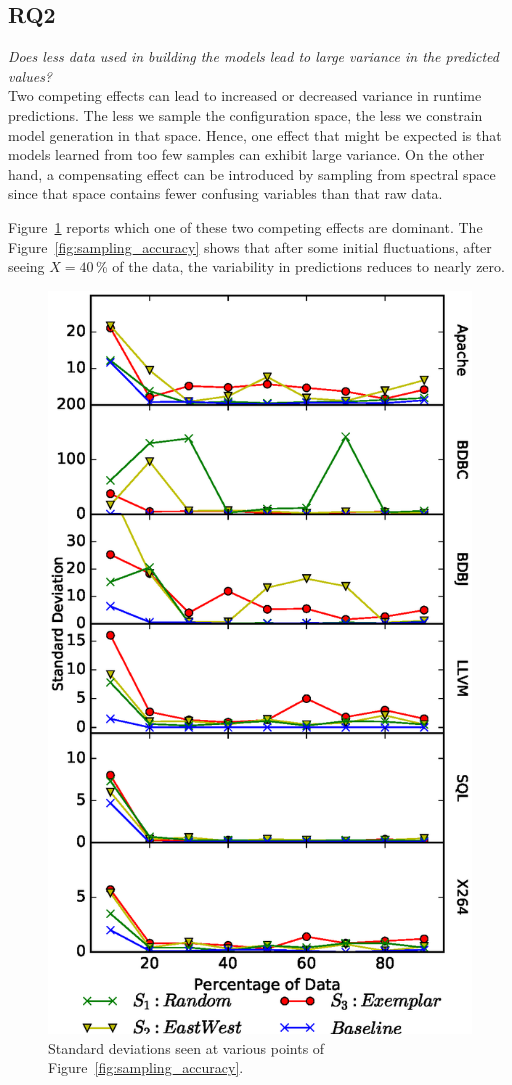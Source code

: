 \documentclass{sig-alternative}
\newcommand{\fig}[1]{Figure~\ref{fig:#1}}
\begin{document}
\subsection{RQ2}

{\em
Does less data used in building the models lead to large variance in the predicted values?}\\

Two competing effects can lead to increased or decreased  variance  in 
runtime predictions.
The   less we sample the configuration space,
the less we constrain model generation in that space. Hence, one effect that might be expected
is that models learned
from too few samples can exhibit large variance. 
On the other hand,
a  compensating effect can be introduced by sampling from spectral space
since that space contains fewer confusing variables than that raw data.

\fig{Variance} reports which one of these two competing effects are dominant. 
The \fig{sampling_accuracy} shows that after some initial fluctuations,
after seeing $X=40$\,\% of the data, the variability in predictions reduces to nearly zero.


\begin{figure}[!t]
\includegraphics[width=0.9\linewidth]{Figures/Variance.eps}
\caption{Standard deviations seen at various points of  \fig{sampling_accuracy}.}\label{fig:Variance}
\end{figure}
\end{document}
